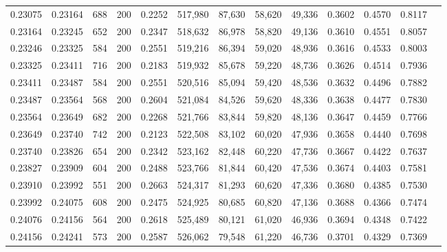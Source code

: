 \begin{tabular}{rrrrrrrrrrrrr}
0.23075 & 0.23164 &    688 & 200 &                                     0.2252 & 517,980 &  87,630 &  58,620 &  49,336 & 0.3602 & 0.4570 & 0.8117 \\
0.23164 & 0.23245 &    652 & 200 &                                     0.2347 & 518,632 &  86,978 &  58,820 &  49,136 & 0.3610 & 0.4551 & 0.8057 \\
0.23246 & 0.23325 &    584 & 200 &                                     0.2551 & 519,216 &  86,394 &  59,020 &  48,936 & 0.3616 & 0.4533 & 0.8003 \\
0.23325 & 0.23411 &    716 & 200 &                                     0.2183 & 519,932 &  85,678 &  59,220 &  48,736 & 0.3626 & 0.4514 & 0.7936 \\
0.23411 & 0.23487 &    584 & 200 &                                     0.2551 & 520,516 &  85,094 &  59,420 &  48,536 & 0.3632 & 0.4496 & 0.7882 \\
0.23487 & 0.23564 &    568 & 200 &                                     0.2604 & 521,084 &  84,526 &  59,620 &  48,336 & 0.3638 & 0.4477 & 0.7830 \\
0.23564 & 0.23649 &    682 & 200 &                                     0.2268 & 521,766 &  83,844 &  59,820 &  48,136 & 0.3647 & 0.4459 & 0.7766 \\
0.23649 & 0.23740 &    742 & 200 &                                     0.2123 & 522,508 &  83,102 &  60,020 &  47,936 & 0.3658 & 0.4440 & 0.7698 \\
0.23740 & 0.23826 &    654 & 200 &                                     0.2342 & 523,162 &  82,448 &  60,220 &  47,736 & 0.3667 & 0.4422 & 0.7637 \\
0.23827 & 0.23909 &    604 & 200 &                                     0.2488 & 523,766 &  81,844 &  60,420 &  47,536 & 0.3674 & 0.4403 & 0.7581 \\
0.23910 & 0.23992 &    551 & 200 &                                     0.2663 & 524,317 &  81,293 &  60,620 &  47,336 & 0.3680 & 0.4385 & 0.7530 \\
0.23992 & 0.24075 &    608 & 200 &                                     0.2475 & 524,925 &  80,685 &  60,820 &  47,136 & 0.3688 & 0.4366 & 0.7474 \\
0.24076 & 0.24156 &    564 & 200 &                                     0.2618 & 525,489 &  80,121 &  61,020 &  46,936 & 0.3694 & 0.4348 & 0.7422 \\
0.24156 & 0.24241 &    573 & 200 &                                     0.2587 & 526,062 &  79,548 &  61,220 &  46,736 & 0.3701 & 0.4329 & 0.7369 \\

\end{tabular}
